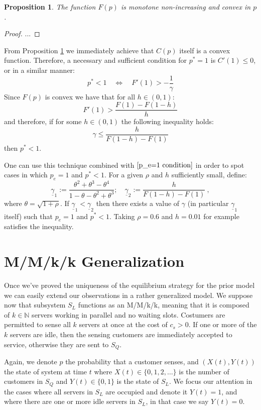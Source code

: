 \documentclass[11pt]{article}
\numberwithin{equation}{section}
\newtheorem{proposition}{Proposition}[section]
\begin{document}
\begin{proposition}
The function $F(p)$ is monotone non-increasing and convex in $p$. \label{F(p) conv}
\end{proposition}
\begin{proof}
...
\end{proof}

From Proposition \ref{F(p) conv} we immediately achieve that $C(p)$ itself is a convex function. Therefore, a necessary and sufficient condition for $p^*=1$ is $C'(1) \leq 0$, or in a similar manner:
\[p^*<1 \quad \Leftrightarrow \quad F'(1) > -\frac{1}{\gamma}\]
Since $F(p)$ is convex we have that for all $h \in (0,1)$:
\[ F'(1) > \frac{F(1) - F(1-h)}{h} \]
and therefore, if for some $h \in (0,1)$ the following inequality holds:
\[ \gamma \leq \frac{h}{F(1-h) - F(1)} \]
then $p^* < 1$.

One can use this technique combined with $\ref{p_e=1 condition}$ in order to spot cases in which $p_e=1$ and $p^*<1$. For a given $\rho$ and $h$ sufficiently small, define:
\[ \underline{\gamma}_1 :=  \frac{\theta^2 + \theta^3 - \theta^4}{1- \theta - \theta^2 + \theta^3}; \quad \underline{\gamma}_2 := \frac{h}{F(1-h) - F(1)}\:,\]
where $\theta=\sqrt{1+\rho}$. If $\underline{\gamma}_1 < \underline{\gamma}_2$ then there exists a value of $\gamma$ (in particular $\underline{\gamma}_1$ itself) such that $p_e=1$ and $p^*<1$. Taking $\rho=0.6$ and $h=0.01$ for example satisfies the inequality. 


\newpage
\section{M/M/k/k Generalization}
Once we've proved the uniqueness of the equilibrium strategy for the prior model we can easily extend our observations in a rather generalized model. We suppose now that subsystem $S_L$ functions as an M/M/k/k, meaning that it is composed of $k \in \mathbb{N}$ servers working in parallel and no waiting slots. Costumers are permitted to sense all $k$ servers at once at the cost of $c_s > 0$. If one or more of the $k$ servers are idle, then the sensing customers are immediately accepted to service, otherwise they are sent to $S_Q$.

Again, we denote $p$ the probability that a customer senses, and $(X(t),Y(t))$ the state of system at time $t$ where $X(t) \in \lbrace 0,1,2, \ldots \rbrace$ is the number of customers in $S_Q$ and $Y(t) \in \lbrace 0,1 \rbrace$ is the state of $S_L$. We focus our attention in the cases where all servers in $S_L$ are occupied and denote it $Y(t)=1$, and where there are one or more idle servers in $S_L$, in that case we say $Y(t)=0$.
\end{document}
